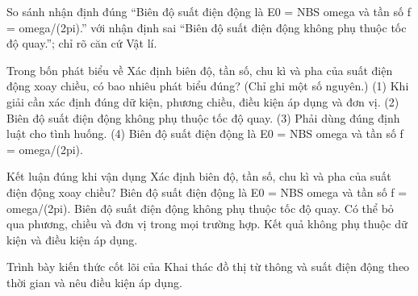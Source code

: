 \begin{bt}
So sánh nhận định đúng “Biên độ suất điện động là E0 = NBS omega và tần số f = omega/(2pi).” với nhận định sai “Biên độ suất điện động không phụ thuộc tốc độ quay.”; chỉ rõ căn cứ Vật lí.
\end{bt}

\begin{ex}
Trong bốn phát biểu về Xác định biên độ, tần số, chu kì và pha của suất điện động xoay chiều, có bao nhiêu phát biểu đúng? (Chỉ ghi một số nguyên.) (1) Khi giải cần xác định đúng dữ kiện, phương chiều, điều kiện áp dụng và đơn vị. (2) Biên độ suất điện động không phụ thuộc tốc độ quay. (3) Phải dùng đúng định luật cho tình huống. (4) Biên độ suất điện động là E0 = NBS omega và tần số f = omega/(2pi).
\end{ex}

\begin{ex}
Kết luận đúng khi vận dụng Xác định biên độ, tần số, chu kì và pha của suất điện động xoay chiều?
\choice
{\True Biên độ suất điện động là E0 = NBS omega và tần số f = omega/(2pi).}
{Biên độ suất điện động không phụ thuộc tốc độ quay.}
{Có thể bỏ qua phương, chiều và đơn vị trong mọi trường hợp.}
{Kết quả không phụ thuộc dữ kiện và điều kiện áp dụng.}
\end{ex}

\begin{bt}
Trình bày kiến thức cốt lõi của Khai thác đồ thị từ thông và suất điện động theo thời gian và nêu điều kiện áp dụng.
\end{bt}


